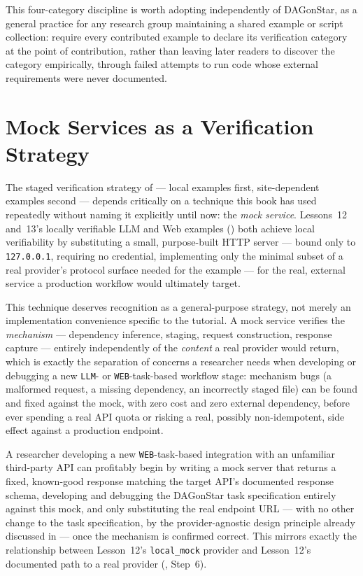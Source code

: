 \begin{practicebox}
This four-category discipline is worth adopting independently of DAGonStar,
as a general practice for any research group maintaining a shared example or
script collection: require every contributed example to declare its
verification category at the point of contribution, rather than leaving
later readers to discover the category empirically, through failed attempts
to run code whose external requirements were never documented.
\end{practicebox}

\section{Mock Services as a Verification Strategy}

The staged verification strategy of  --- local
examples first, site-dependent examples second --- depends critically on a
technique this book has used repeatedly without naming it explicitly until
now: the \emph{mock service}. Lessons~12 and~13's locally verifiable LLM and
Web examples () both achieve local
verifiability by substituting a small, purpose-built HTTP server --- bound
only to \texttt{127.0.0.1}, requiring no credential, implementing only the
minimal subset of a real provider's protocol surface needed for the
example --- for the real, external service a production workflow would
ultimately target.

This technique deserves recognition as a general-purpose strategy, not
merely an implementation convenience specific to the tutorial. A mock
service verifies the \emph{mechanism} --- dependency inference, staging,
request construction, response capture --- entirely independently of the
\emph{content} a real provider would return, which is exactly the
separation of concerns a researcher needs when developing or debugging a
new \texttt{LLM}- or \texttt{WEB}-task-based workflow stage: mechanism bugs
(a malformed request, a missing dependency, an incorrectly staged file) can
be found and fixed against the mock, with zero cost and zero external
dependency, before ever spending a real API quota or risking a real,
possibly non-idempotent, side effect against a production endpoint.

\begin{example}
A researcher developing a new \texttt{WEB}-task-based integration with an
unfamiliar third-party API can profitably begin by writing a mock server
that returns a fixed, known-good response matching the target API's
documented response schema, developing and debugging the DAGonStar task
specification entirely against this mock, and only substituting the real
endpoint URL --- with no other change to the task specification, by the
provider-agnostic design principle already discussed in
 --- once the mechanism is confirmed correct. This
mirrors exactly the relationship between Lesson~12's \texttt{local\_mock}
provider and Lesson~12's documented path to a real provider
(, Step~6).
\end{example}


